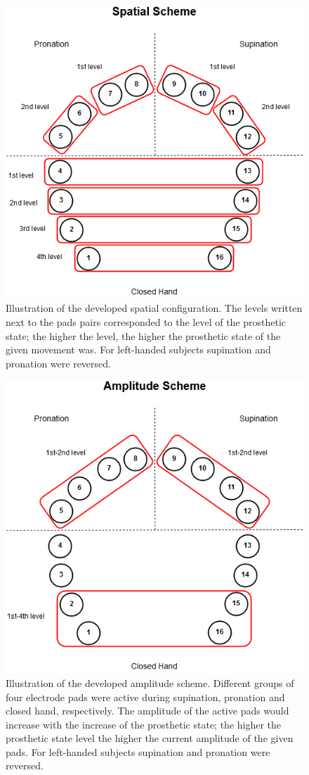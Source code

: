 \begin{figure}[H]                 
	\includegraphics[width=.8\textwidth]{figures/El_array_spatial}  
	\caption{Illustration of the developed spatial configuration. The levels written next to the pads pairs corresponded to the level of the prosthetic state; the higher the level, the higher the prosthetic state of the given movement was. For left-handed subjects supination and pronation were reversed.}
	\label{fig:pa:spatial} 
\end{figure}

\begin{figure}[H]                 
	\includegraphics[width=.8\textwidth]{figures/El_array_amplitude}  
	\caption{Illustration of the developed amplitude scheme. Different groups of four electrode pads were active during supination, pronation and closed hand, respectively. The amplitude of the active pads would increase with the increase of the prosthetic state; the higher the prosthetic state level the higher the current amplitude of the given pads. For left-handed subjects supination and pronation were reversed.}
	\label{fig:pa:amplitude} 
\end{figure}
